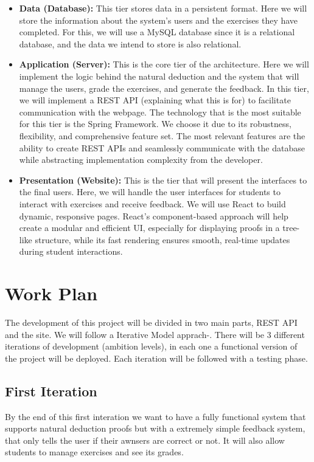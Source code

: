 \begin{itemize}
    \item \textbf{Data (Database):} This tier stores data in a persistent format. Here we will store the information about the system's users and the exercises they have completed. For this, we will use a MySQL database since it is a relational database, and the data we intend to store is also relational.

    \item \textbf{Application (Server):} This is the core tier of the architecture. Here we will implement the logic behind the natural deduction and the system that will manage the users, grade the exercises, and generate the feedback. In this tier, we will implement a REST API (explaining what this is for) to facilitate communication with the webpage. The technology that is the most suitable for this tier is the Spring Framework. We choose it due to its robustness, flexibility, and comprehensive feature set. The most relevant features are the ability to create REST APIs and seamlessly communicate with the database while abstracting implementation complexity from the developer.

    \item \textbf{Presentation (Website):} This is the tier that will present the interfaces to the final users. Here, we will handle the user interfaces for students to interact with exercises and receive feedback. We will use React to build dynamic, responsive pages. React's component-based approach will help create a modular and efficient UI, especially for displaying proofs in a tree-like structure, while its fast rendering ensures smooth, real-time updates during student interactions.
\end{itemize}

\section{Work Plan}
The development of this project will be divided in two main parts, REST API and the site. We will follow a Iterative Model apprach-. There will be 3 different iterations of development (ambition levels), in each one a functional version of the project will be deployed. Each iteration will be followed with a testing phase.

\subsection{First Iteration}
By the end of this first interation we want to have a fully functional system that supports natural deduction proofs but with a extremely simple feedback system, that only tells the user if their awnsers are correct or not. It will also allow students to manage exercises and see its grades.

